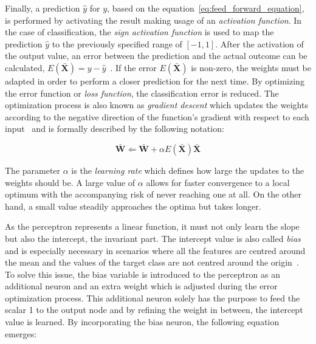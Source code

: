 \documentclass[draft,final]{vutinfth} %
\newcommand{\p}[1]{see p. #1}
\begin{document}
    Finally, a prediction $\hat{y}$ for $y$, based on the equation~\eqref{eq:feed_forward_equation}, is performed by activating the result making usage of an \textit{activation function}.
    In the case of classification, the \textit{sign activation function} is used to map the prediction $\hat{y}$ to the previously specified range of $[-1,1]$.
    After the activation of the output value, an error between the prediction and the actual outcome can be calculated, $E(\bar{\boldsymbol{X}}) = y - \hat{y}$~\citep[\p{5ff}]{aggarwal_neural_2018}.
    If the error $E(\bar{\boldsymbol{X}})$ is non-zero, the weights must be adapted in order to perform a closer prediction for the next time.
    By optimizing the error function or \textit{loss function}, the classification error is reduced.
    The optimization process is also known as \textit{gradient descent} which updates the weights according to the negative direction of the function's gradient with respect to each input~\citep[\p{7}]{aggarwal_neural_2018} and is formally described by the following notation:

    \begin{equation}
        \bar{\boldsymbol{W}} \Leftarrow \bar{\boldsymbol{W}} + \alpha E(\bar{\boldsymbol{X}})\bar{\boldsymbol{X}}\label{eq:weight_adjusting}
    \end{equation}

    The parameter $\alpha$ is the \textit{learning rate} which defines how large the updates to the weights should be.
    A large value of $\alpha$ allows for faster convergence to a local optimum with the accompanying risk of never reaching one at all.
    On the other hand, a small value steadily approaches the optima but takes longer.


    As the perceptron represents a linear function, it must not only learn the slope but also the intercept, the invariant part.
    The intercept value is also called \textit{bias} and is especially necessary in scenarios where all the features are centred around the mean and the values of the target class are not centred around the origin~\citep[\p{6}]{aggarwal_neural_2018}.
    To solve this issue, the bias variable is introduced to the perceptron as an additional neuron and an extra weight which is adjusted during the error optimization process.
    This additional neuron solely has the purpose to feed the scalar 1 to the output node and by refining the weight in between, the intercept value is learned.
    By incorporating the bias neuron, the following equation emerges:
\end{document}
